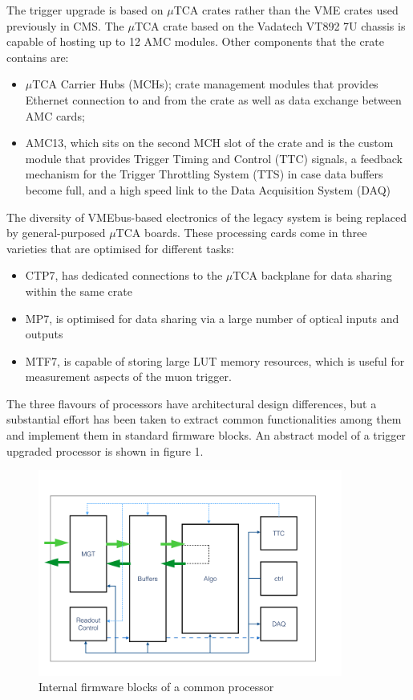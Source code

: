\documentclass[a4paper]{jpconf}
\begin{document}
The trigger upgrade is based on $\mu$TCA crates rather than the VME crates used previously in CMS. The $\mu$TCA crate based on the Vadatech VT892 7U chassis \cite{vadatech} is capable of hosting up to 12 AMC modules. Other components that the crate contains are:
\begin{itemize}
  \item $\mu$TCA Carrier Hubs (MCHs); crate management modules that provides Ethernet connection to and from the crate as well as data exchange between AMC cards; 
  \item AMC13, which sits on the second MCH slot of the crate and is the custom module that provides Trigger Timing and Control (TTC) signals, a feedback mechanism for the Trigger Throttling System (TTS) in case data buffers become full, and a high speed link to the Data Acquisition System (DAQ)
\end{itemize}
The diversity of VMEbus-based electronics of the legacy system is being replaced by general-purposed $\mu$TCA boards. These processing cards come in three varieties that are optimised for different tasks: 
\begin{itemize}
  \item CTP7, has dedicated connections to the $\mu$TCA backplane for data sharing within the same crate
  \item MP7, is optimised for data sharing via a large number of optical inputs and outputs
  \item MTF7, is capable of storing large LUT memory resources, which is useful for measurement aspects of the muon trigger. 
\end{itemize}
The three flavours of processors have architectural design differences, but a substantial effort has been taken to extract common functionalities among them and implement them in standard firmware blocks. An abstract model of a trigger upgraded processor is shown in figure 1. 

\begin{figure}
\begin{center}
\includegraphics[width=100mm,scale=0.5]{figures/Figure1.png}
\end{center}
\caption{\label{label} Internal firmware blocks of a common processor}
\end{figure}
\end{document}
